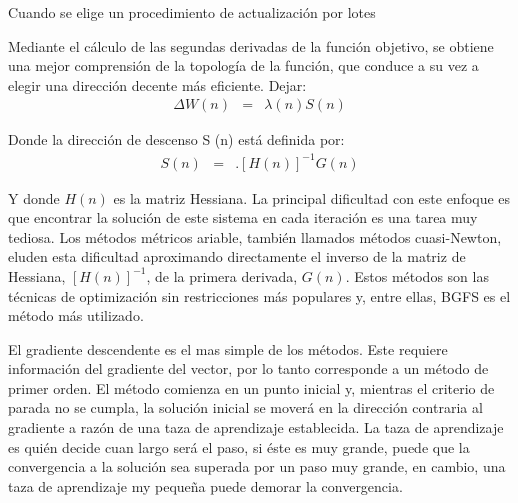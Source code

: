Cuando se elige un procedimiento de actualización por lotes

Mediante el cálculo de las segundas derivadas de la función objetivo, se obtiene una mejor comprensión de la topología de la función, que conduce a su vez a elegir una dirección decente más eficiente. Dejar:
\begin{eqnarray}
	\Delta W(n) &=& \lambda(n)S(n)
\end{eqnarray}

Donde la dirección de descenso S (n) está definida por:
\begin{eqnarray}
	S(n) &=& .[H(n)]^{-1}G(n)
\end{eqnarray}

Y donde $H(n)$ es la matriz Hessiana. La principal dificultad con este enfoque es que encontrar la solución de este sistema en cada iteración es una tarea muy tediosa. Los métodos métricos ariable, también llamados métodos cuasi-Newton, eluden esta dificultad aproximando directamente el inverso de la matriz de Hessiana, $[H(n)]^{-1}$, de la primera derivada, $G(n)$. Estos métodos son las técnicas de optimización sin restricciones más populares y, entre ellas, BGFS es el método más utilizado.%



El gradiente descendente es el mas simple de los métodos. Este requiere información del gradiente del vector, por lo tanto corresponde a un método de primer orden. El método comienza en un punto inicial y, mientras el criterio de parada no se cumpla, la solución inicial se moverá en la dirección contraria al gradiente a razón de una taza de aprendizaje establecida. La taza de aprendizaje es quién decide cuan largo será el paso, si éste es muy grande, puede que la convergencia a la solución sea superada por un paso muy grande, en cambio, una taza de aprendizaje my pequeña puede demorar la convergencia.

